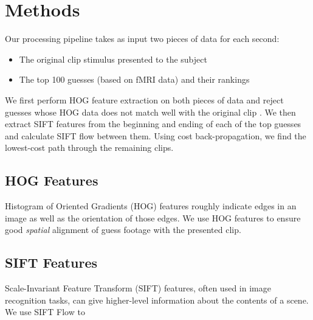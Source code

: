 
\section{Methods}

Our processing pipeline takes as input two pieces of data for each second:

\begin{itemize}
\item The original clip stimulus presented to the subject
\item The top 100 guesses (based on fMRI data) and their rankings
\end{itemize}

We first perform HOG feature extraction on both pieces of data and reject guesses whose HOG data does not match well with the original clip .  We then extract SIFT features from the beginning and ending of each of the top guesses and calculate SIFT flow between them.  Using cost back-propagation, we find the lowest-cost path through the remaining clips.  

\subsection{HOG Features}

Histogram of Oriented Gradients (HOG) features roughly indicate edges in an image as well as the orientation of those edges.  We use HOG features to ensure good \emph{spatial} alignment of guess footage with the presented clip.

\subsection{SIFT Features}

Scale-Invariant Feature Transform (SIFT) features, often used in image recognition tasks, can give higher-level information about the contents of a scene.  We use SIFT Flow  to 